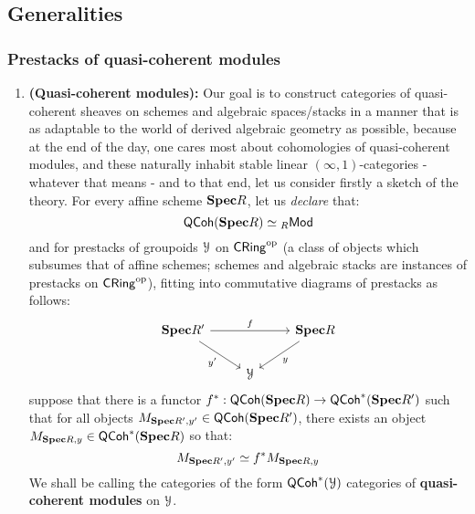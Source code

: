         \subsection{Generalities}
            \subsubsection{Prestacks of quasi-coherent modules}
                \begin{definition} \label{def: qcoh_def}
                    \noindent
                    \begin{enumerate}
                        \item \textbf{(Quasi-coherent modules):} Our goal is to construct categories of quasi-coherent sheaves on schemes and algebraic spaces/stacks in a manner that is as adaptable to the world of derived algebraic geometry as possible, because at the end of the day, one cares most about cohomologies of quasi-coherent modules, and these  naturally inhabit stable linear $(\infty,1)$-categories - whatever that means - and to that end, let us consider firstly a sketch of the theory. For every affine scheme $\mathbf{Spec} R$, let us \textit{declare} that:
                            $$\mathsf{QCoh}(\mathbf{Spec} R) \simeq {}_R\mathsf{Mod}$$
                        and for prestacks of groupoids $\mathcal{Y}$ on $\mathsf{CRing}^{\mathrm{op}}$ (a class of objects which subsumes that of affine schemes; schemes and algebraic stacks are instances of prestacks on $\mathsf{CRing}^{\mathrm{op}}$), fitting into commutative diagrams of prestacks as follows:
                            $$
                                \begin{tikzcd}
                                	{\Spec R'} && {\Spec R} \\
                                	& \calY
                                	\arrow["{y'}"', from=1-1, to=2-2]
                                	\arrow["y", from=1-3, to=2-2]
                                	\arrow["f", from=1-1, to=1-3]
                                \end{tikzcd}
                            $$
                        suppose that there is a functor $f^*: \mathsf{QCoh}(\mathbf{Spec} R) \to \mathsf{QCoh}^*(\mathbf{Spec} R')$ such that for all objects $M_{\mathbf{Spec} R', y'} \in \mathsf{QCoh}(\mathbf{Spec} R')$, there exists an object $M_{\mathbf{Spec} R, y} \in \mathsf{QCoh}^*(\mathbf{Spec} R)$ so that:
                            $$M_{\mathbf{Spec} R', y'} \simeq f^* M_{\mathbf{Spec} R, y}$$
                        We shall be calling the categories of the form $\mathsf{QCoh}^*(\mathcal{Y})$ categories of \textbf{quasi-coherent modules} on $\mathcal{Y}$.

\end{enumerate}
\end{definition}
